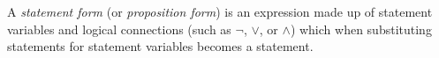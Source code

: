 \guard



% 
% 
% 

\begin{defn}
\label{defn:statementForm}
  A \emph{statement form} (or \emph{proposition form}) is an expression made up of statement variables and logical connections (such as $\neg$, $\vee$, or $\wedge$) which when substituting statements for statement variables becomes a statement.
\end{defn}
